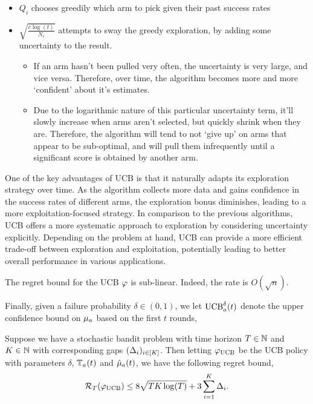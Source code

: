 \begin{itemize}
    \item $Q_i$ chooses greedily which arm to pick given their past success rates
    \item $\sqrt{\frac{c\log(t)}{N_i}}$ attempts to sway the greedy exploration, by adding some uncertainty to the result.
    \begin{itemize}
        \item If an arm hasn't been pulled very often, the uncertainty is very large, and vice versa. Therefore, over time, the algorithm becomes more and more `confident' about it's estimates.
        \item Due to the logarithmic nature of this particular uncertainty term, it'll slowly increase when arms aren't selected, but quickly shrink when they are. Therefore, the algorithm will tend to not `give up' on arms that appear to be sub-optimal, and will pull them infrequently until a significant score is obtained by another arm.
    \end{itemize}
\end{itemize}

One of the key advantages of UCB is that it naturally adapts its exploration strategy over time. As the algorithm collects more data and gains confidence in the success rates of different arms, the exploration bonus diminishes, leading to a more exploitation-focused strategy. In comparison to the previous algorithms, UCB offers a more systematic approach to exploration by considering uncertainty explicitly. Depending on the problem at hand, UCB can provide a more efficient trade-off between exploration and exploitation, potentially leading to better overall performance in various applications.

The regret bound for the UCB $\varphi$ is sub-linear. Indeed, the rate is $O(\sqrt{n})$.

Finally, given a failure probability $\delta \in (0,1)$, we let $\mathrm{UCB}_{a}^{\delta}(t)$ denote the upper confidence bound on $\mu_{a}$ based on the first $t$ rounds,


\begin{theorem}\label{thm:ucbRegretBound}
Suppose we have a stochastic bandit problem with time horizon $T \in \mathbb{N}$ and $K \in \mathbb{N}$ with corresponding gaps $(\Delta_{i})_{i \in [K]}$. Then letting $\varphi_{\mathrm{UCB}}$ be the UCB policy with parameters $\delta$, $\mathbb{T}_{a}(t)$ and $\hat{\mu}_{a}(t)$, we have the following regret bound,
\begin{align*}
\mathcal{R}_{T}(\varphi_{\mathrm{UCB}}) \leq 8 \sqrt{T K \log(T)} + 3 \sum_{i=1}^{K} \Delta_{i}.
\end{align*}
\end{theorem}

